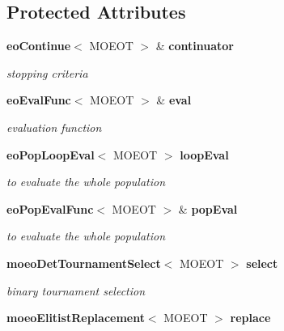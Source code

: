 \subsection*{Protected Attributes}
\begin{CompactItemize}
\item 
{\bf eo\-Continue}$<$ MOEOT $>$ \& {\bf continuator}\label{classmoeoNSGAII_7eb1e36631eebbe3216167b1077e3a53}

\begin{CompactList}\small\item\em stopping criteria \item\end{CompactList}\item 
{\bf eo\-Eval\-Func}$<$ MOEOT $>$ \& {\bf eval}\label{classmoeoNSGAII_ae15222c7c9d4a5c3d43df39ad73e008}

\begin{CompactList}\small\item\em evaluation function \item\end{CompactList}\item 
{\bf eo\-Pop\-Loop\-Eval}$<$ MOEOT $>$ {\bf loop\-Eval}\label{classmoeoNSGAII_2e278f1cd90394099b13850ad612104d}

\begin{CompactList}\small\item\em to evaluate the whole population \item\end{CompactList}\item 
{\bf eo\-Pop\-Eval\-Func}$<$ MOEOT $>$ \& {\bf pop\-Eval}\label{classmoeoNSGAII_2926b2c13fbf66aa34ca8bb2d1268df4}

\begin{CompactList}\small\item\em to evaluate the whole population \item\end{CompactList}\item 
{\bf moeo\-Det\-Tournament\-Select}$<$ MOEOT $>$ {\bf select}\label{classmoeoNSGAII_6134c5baa1c6921aaacd67f6f452871a}

\begin{CompactList}\small\item\em binary tournament selection \item\end{CompactList}\item 
{\bf moeo\-Elitist\-Replacement}$<$ MOEOT $>$ {\bf replace}\label{classmoeoNSGAII_75bc4b735c5de2a6fc93b2f2b63c7251}


\end{CompactItemize}
